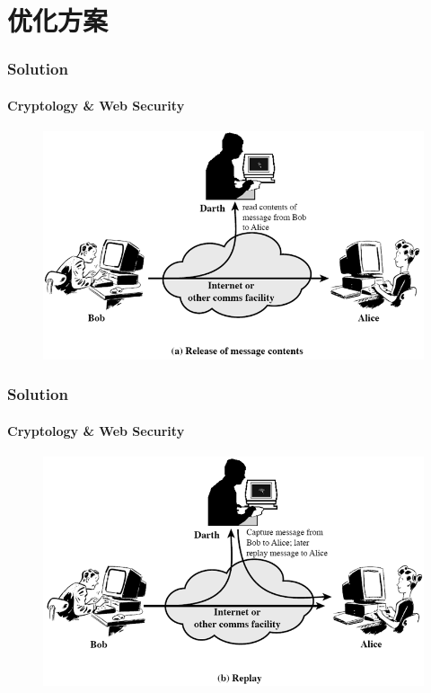 \documentclass[UTF8]{ctexbeamer}
\begin{document}
\section{优化方案}

\begin{frame}
	\frametitle{Solution}
	\framesubtitle{Cryptology \& Web Security}
	\begin{figure}
            \includegraphics[width=0.6\linewidth]{sniff.png}
	\end{figure}
\end{frame}

\begin{frame}
	\frametitle{Solution}
	\framesubtitle{Cryptology \& Web Security}
	\begin{figure}
            \includegraphics[width=0.6\linewidth]{replay.png}
	\end{figure}
\end{frame}
\end{document}
